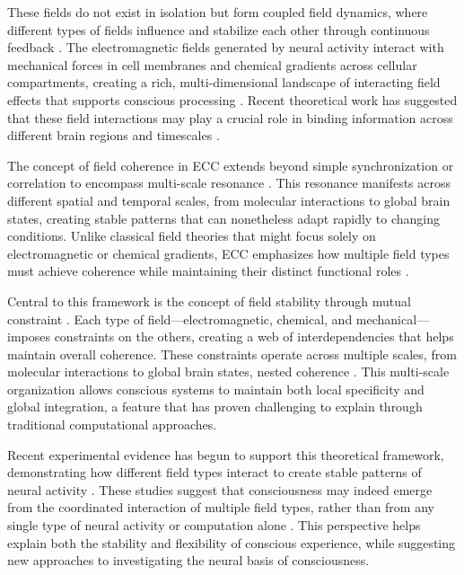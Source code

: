 \begin{refsection}
These fields do not exist in isolation but form coupled field dynamics, where different types of fields influence and stabilize each other through continuous feedback \cite{McFadden2002}. The electromagnetic fields generated by neural activity interact with mechanical forces in cell membranes and chemical gradients across cellular compartments, creating a rich, multi-dimensional landscape of interacting field effects that supports conscious processing \cite{Pockett2012}. Recent theoretical work has suggested that these field interactions may play a crucial role in binding information across different brain regions and timescales \cite{Nunez2010}.

The concept of field coherence in ECC extends beyond simple synchronization or correlation to encompass multi-scale resonance \cite{Singer2009}. This resonance manifests across different spatial and temporal scales, from molecular interactions to global brain states, creating stable patterns that can nonetheless adapt rapidly to changing conditions. Unlike classical field theories that might focus solely on electromagnetic or chemical gradients, ECC emphasizes how multiple field types must achieve coherence while maintaining their distinct functional roles \cite{Haken2006}.

Central to this framework is the concept of field stability through mutual constraint \cite{Barrett2014}. Each type of field—electromagnetic, chemical, and mechanical—imposes constraints on the others, creating a web of interdependencies that helps maintain overall coherence. These constraints operate across multiple scales, from molecular interactions to global brain states, nested coherence \cite{Raichle2006}. This multi-scale organization allows conscious systems to maintain both local specificity and global integration, a feature that has proven challenging to explain through traditional computational approaches.

Recent experimental evidence has begun to support this theoretical framework, demonstrating how different field types interact to create stable patterns of neural activity \cite{DelGiudice1985}. These studies suggest that consciousness may indeed emerge from the coordinated interaction of multiple field types, rather than from any single type of neural activity or computation alone \cite{Atasoy2019}. This perspective helps explain both the stability and flexibility of conscious experience, while suggesting new approaches to investigating the neural basis of consciousness.


\end{refsection}
